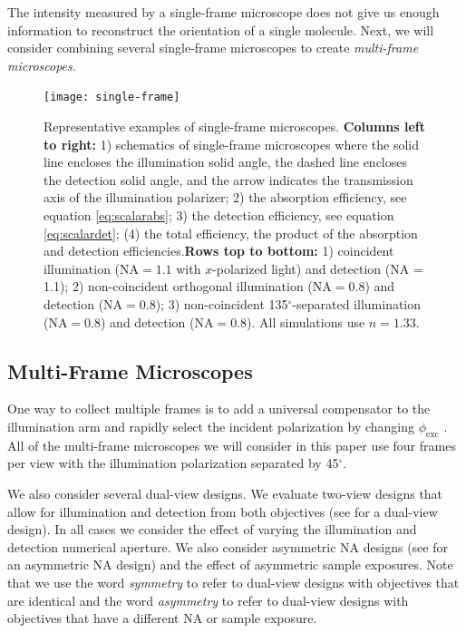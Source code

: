 \documentclass[10pt]{article}
\begin{document}
The intensity measured by a single-frame microscope does not give us enough
information to reconstruct the orientation of a single molecule. Next, we
will consider combining several single-frame microscopes to create
\emph{multi-frame microscopes.}

\begin{figure}[H]
\centering\texttt{[image: single-frame]}
\caption{Representative examples of single-frame microscopes.\newline \newline
  \textbf{Columns left to right:} 1) schematics of single-frame microscopes
  where the solid line encloses the illumination solid angle, the dashed line
  encloses the detection solid angle, and the arrow indicates the transmission
  axis of the illumination polarizer; 2) the absorption efficiency, see equation
  \ref{eq:scalarabs}; 3) the detection efficiency, see equation
  \ref{eq:scalardet}; (4) the total efficiency, the product of the absorption
  and detection efficiencies.\newline \newline \textbf{Rows top to bottom:} 1)
  coincident illumination ($\text{NA} = 1.1$ with $x$-polarized light) and
  detection (NA = 1.1); 2) non-coincident orthogonal illumination
  ($\text{NA} = 0.8$) and detection ($\text{NA} = 0.8$); 3) non-coincident
  135${}^{\circ}$-separated illumination ($\text{NA} = 0.8$) and detection
  ($\text{NA} = 0.8$). All simulations use $n=1.33$.}
  \label{fig:single-frame}
\end{figure}


\subsection{Multi-Frame Microscopes}\label{designs}
One way to collect multiple frames is to add a universal compensator to the
illumination arm and rapidly select the incident polarization by changing
$\phi_{\text{exc}}$ \cite{oldenbourg1995}. All of the multi-frame microscopes we
will consider in this paper use four frames per view with the illumination
polarization separated by 45${}^{\circ}$.

We also consider several dual-view designs. We evaluate two-view designs that
allow for illumination and detection from both objectives (see \cite{wu2013} for
a dual-view design). In all cases we consider the effect of varying the
illumination and detection numerical aperture. We also consider asymmetric NA
designs (see \cite{wu2017} for an asymmetric NA design) and the effect of
asymmetric sample exposures. Note that we use the word \emph{symmetry} to refer
to dual-view designs with objectives that are identical and the word
\emph{asymmetry} to refer to dual-view designs with objectives that have a
different NA or sample exposure.
\end{document}
